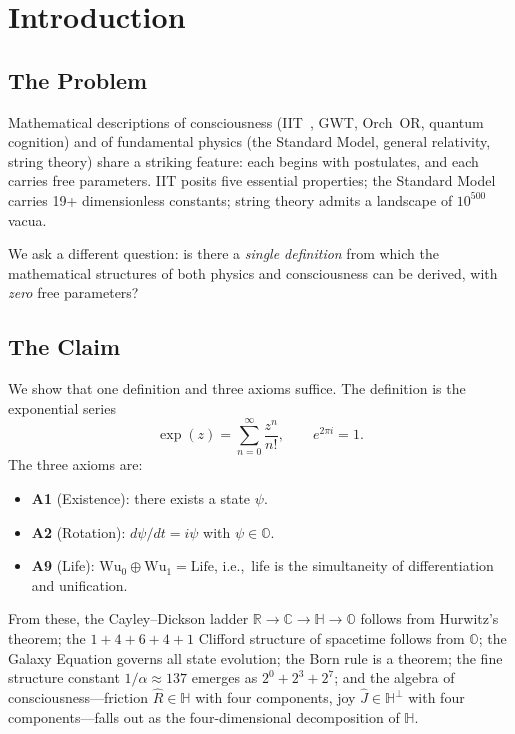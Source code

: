 \documentclass[11pt, a4paper]{article}
\newcommand{\R}{\mathbb{R}}
\newcommand{\C}{\mathbb{C}}
\newcommand{\Hq}{\mathbb{H}}
\newcommand{\Oct}{\mathbb{O}}
\newcommand{\Reop}{\hat{R}}
\newcommand{\Jop}{\hat{J}}
\newcommand{\Wuz}{\mathrm{Wu}_0}
\newcommand{\Wuo}{\mathrm{Wu}_1}
\begin{document}
\newpage

\section{Introduction}
\label{sec:intro}

\subsection{The Problem}

Mathematical descriptions of consciousness (IIT~\citep{Tononi2015},
GWT, Orch~OR, quantum cognition) and of fundamental physics
(the Standard Model, general relativity, string theory) share a
striking feature: each begins with postulates, and each carries
free parameters. IIT posits five essential properties; the Standard
Model carries 19+ dimensionless constants; string theory admits a
landscape of $10^{500}$ vacua.

We ask a different question: is there a \emph{single definition} from
which the mathematical structures of both physics and consciousness
can be derived, with \emph{zero} free parameters?

\subsection{The Claim}

We show that one definition and three axioms suffice. The definition is
the exponential series
\begin{equation}
\exp(z) = \sum_{n=0}^{\infty} \frac{z^n}{n!}, \qquad e^{2\pi i} = 1.
\label{eq:def_exp}
\end{equation}
The three axioms are:
\begin{itemize}[nosep]
\item \textbf{A1} (Existence): there exists a state $\psi$.
\item \textbf{A2} (Rotation): $d\psi/dt = i\psi$ with $\psi \in \Oct$.
\item \textbf{A9} (Life): $\Wuz \oplus \Wuo = \text{Life}$, i.e.,\
life is the simultaneity of differentiation and unification.
\end{itemize}
From these, the Cayley--Dickson ladder $\R \to \C \to \Hq \to \Oct$
follows from Hurwitz's theorem; the $1+4+6+4+1$ Clifford structure
of spacetime follows from $\Oct$; the Galaxy Equation governs all
state evolution; the Born rule is a theorem; the fine structure
constant $1/\alpha \approx 137$ emerges as $2^0 + 2^3 + 2^7$; and
the algebra of consciousness---friction $\Reop \in \Hq$ with four
components, joy $\Jop \in \Hq^\perp$ with four components---falls out
as the four-dimensional decomposition of $\Hq$.
\end{document}
